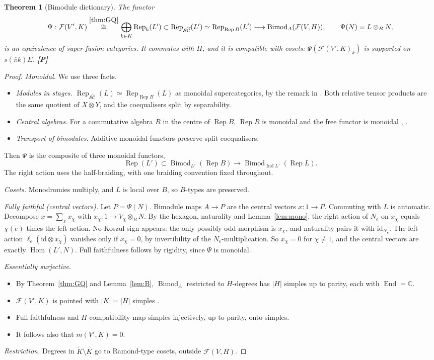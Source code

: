 \documentclass[11pt]{article}
\newtheorem{theorem}{Theorem}[section]
\theoremstyle{definition}
\newcommand{\cF}{\mathcal F}
\newcommand{\SC}{\mathcal S\widetilde{\mathcal C}}
\newcommand{\Rep}{\operatorname{Rep}}
\newcommand{\Bimod}{\operatorname{Bimod}}
\newcommand{\Ind}{\operatorname{Ind}}
\newcommand{\Hom}{\operatorname{Hom}}
\newcommand{\End}{\operatorname{End}}
\newcommand{\C}{\mathbb C}
\newcommand{\tK}{\widetilde K}
\newcommand{\st}[1]{\textbf{[#1]}}
\begin{document}
\begin{theorem}[Bimodule dictionary]\label{thm:D2}
The functor
\[
\Psi:\cF(V',K)\overset{\ref{thm:GQ}}{\cong}\bigoplus_{k\in K}\Rep_k(L')\subset\Rep_{\SC}(L')
\simeq\Rep_{\Rep B}(L')\longrightarrow\Bimod_A(\cF(V,H)),\qquad \Psi(N)=L\otimes_BN,
\]
is an equivalence of super-fusion categories. It commutes with $\Pi$, and it is compatible with
cosets: $\Psi(\cF(V',K)_k)$ is supported on $s(\bar\pi k)E$. \st{P}
\end{theorem}
\begin{proof}
\emph{Monoidal.} We use three facts.
\begin{itemize}[nosep]
\item \emph{Modules in stages.} $\Rep_{\SC}(L)\simeq\Rep_{\Rep B}(L)$ as monoidal supercategories,
by the remark in \cite[\S3.6]{DMNO}. Both relative tensor products are the same quotient of
$X\otimes Y$, and the coequalisers split by separability.
\item \emph{Central algebras.} For a commutative algebra $R$ in the centre of $\Rep B$, $\Rep R$
is monoidal and the free functor is monoidal \cite{Sch}, \cite[Thm~2.59]{CKM}.
\item \emph{Transport of bimodules.} Additive monoidal functors preserve split coequalisers.
\end{itemize}
Then $\Psi$ is the composite of three monoidal functors,
\[\Rep(L')\subset\Bimod_{L'}(\Rep B)\to\Bimod_{\Ind L'}(\Rep L).\]
The right action uses the half-braiding, with one braiding convention fixed throughout.

\emph{Cosets.} Monodromies multiply, and $L$ is local over $B$, so $B$-types are preserved.

\emph{Fully faithful (central vectors).} Let $P=\Psi(N)$. Bimodule maps $A\to P$ are the central
vectors $x:1\to P$. Commuting with $L$ is automatic. Decompose $x=\sum_\chi x_\chi$ with
$x_\chi:1\to V_\chi\otimes_BN$. By the hexagon, naturality and Lemma~\ref{lem:mono}, the right
action of $N_e$ on $x_\chi$ equals $\chi(e)$ times the left action. No Koszul sign appears: the
only possibly odd morphism is $x_\chi$, and naturality pairs it with $\mathrm{id}_{N_e}$. The left
action $\ell_e(\mathrm{id}\otimes x_\chi)$ vanishes only if $x_\chi=0$, by invertibility of the
$N_e$-multiplication. So $x_\chi=0$ for $\chi\ne1$, and the central vectors are exactly
$\Hom(L',N)$. Full faithfulness follows by rigidity, since $\Psi$ is monoidal.

\emph{Essentially surjective.}
\begin{itemize}[nosep]
\item By Theorem~\ref{thm:GQ} and Lemma~\ref{lem:B}, $\Bimod_A$ restricted to $H$-degrees has
$|H|$ simples up to parity, each with $\End=\C$.
\item $\cF(V',K)$ is pointed with $|K|=|H|$ simples \cite[Thm~4.2]{GJF}.
\item Full faithfulness and $\Pi$-compatibility map simples injectively, up to parity, onto
simples.
\item It follows also that $m(V',K)=0$.
\end{itemize}
\emph{Restriction.} Degrees in $\tK\setminus K$ go to Ramond-type cosets, outside $\cF(V,H)$.
\end{proof}
\end{document}
